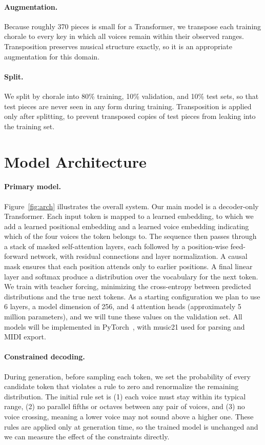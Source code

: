 \documentclass{article}
\begin{document}
\paragraph{Augmentation.} Because roughly 370 pieces is small for a Transformer, we transpose each training chorale to every key in which all voices remain within their observed ranges. Transposition preserves musical structure exactly, so it is an appropriate augmentation for this domain.

\paragraph{Split.} We split by chorale into 80\% training, 10\% validation, and 10\% test sets, so that test pieces are never seen in any form during training. Transposition is applied only after splitting, to prevent transposed copies of test pieces from leaking into the training set.

\section{Model Architecture}
\label{sec:model}

\paragraph{Primary model.} Figure~\ref{fig:arch} illustrates the overall system. Our main model is a decoder-only Transformer. Each input token is mapped to a learned embedding, to which we add a learned positional embedding and a learned voice embedding indicating which of the four voices the token belongs to. The sequence then passes through a stack of masked self-attention layers, each followed by a position-wise feed-forward network, with residual connections and layer normalization. A causal mask ensures that each position attends only to earlier positions. A final linear layer and softmax produce a distribution over the vocabulary for the next token. We train with teacher forcing, minimizing the cross-entropy between predicted distributions and the true next tokens. As a starting configuration we plan to use 6 layers, a model dimension of 256, and 4 attention heads (approximately 5 million parameters), and we will tune these values on the validation set. All models will be implemented in PyTorch~\cite{paszke2019pytorch}, with music21 used for parsing and MIDI export.

\paragraph{Constrained decoding.} During generation, before sampling each token, we set the probability of every candidate token that violates a rule to zero and renormalize the remaining distribution. The initial rule set is (1) each voice must stay within its typical range, (2) no parallel fifths or octaves between any pair of voices, and (3) no voice crossing, meaning a lower voice may not sound above a higher one. These rules are applied only at generation time, so the trained model is unchanged and we can measure the effect of the constraints directly.
\end{document}
